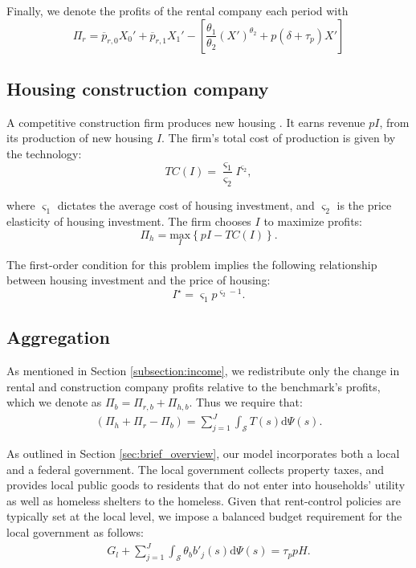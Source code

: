 \documentclass[parskip=full]{article}
\begin{document}
Finally, we denote the profits of the rental company each period with \[\Pi_r=\overline{p}_{r,0}X_0'+\overline{p}_{r,1} X_1'-\left[\frac{\theta_1}{\theta_2}(X')^{\theta_2}+p(\delta+\tau_p) X'\right]\]

\subsection{Housing construction company}\label{sec:construction_company}

A competitive construction firm produces new housing \citep{rotberg-2022}. It earns revenue $pI$, from its production of new housing $I$. The firm's total cost of production is given by the technology:
\begin{equation*}
TC(I)=\frac{\varsigma_{1}}{\varsigma_{2}}I^{\varsigma_{2}}\label{eq:total_cost_structure},
\end{equation*}

\noindent where $\varsigma_{1}$ dictates the average cost of housing investment, and $\varsigma_{2}$ is the price elasticity of housing investment. The firm chooses $I$ to maximize profits:
\begin{equation*}
\label{eq:construction_company_profits}
\Pi_h= \underset{I} {\text{$\mbox{max}$}}{\left\{p I-TC(I)\right\}}.
\end{equation*}

\noindent The first-order condition for this problem implies the following relationship between housing investment and the price of housing:
\begin{equation}
\label{eq:construction_company_first_order_condition}
I^{\star}=\varsigma_{1} p^{\varsigma_{2}-1}.
\end{equation}

\subsection{Aggregation}\label{subsection:aggregation}

As mentioned in Section \ref{subsection:income}, we redistribute only the change in rental and construction company profits relative to the benchmark's profits, which we denote as $\Pi_b=\Pi_{r,b}+\Pi_{h,b}$. Thus we require that:
\begin{align}\label{eq:rebates}
   (\Pi_h+\Pi_r-\Pi_b)=\sum_{j=1}^J \int_\mathcal{S} T(s)\mathrm{d}\Psi(s).
\end{align}

As outlined in Section \ref{sec:brief_overview}, our model incorporates both a local and a federal government. The local government collects property taxes, and provides local public goods to residents that do not enter into households' utility as well as homeless shelters to the homeless. Given that rent-control policies are typically set at the local level, we impose a balanced budget requirement for the local government as follows:
\begin{align}\label{eq:gbc_1}
  G_l +\sum_{j=1}^J \int_\mathcal{S} \theta_{b} b'_{j}(s)\mathrm{d}\Psi(s) = \tau_{p} p H.
\end{align}
\end{document}
